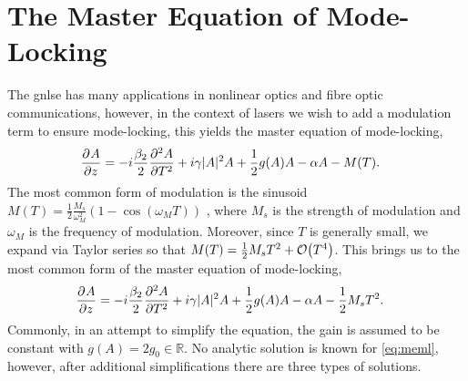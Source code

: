 \section{The Master Equation of Mode-Locking}
\label{chap:meml}
The \gls{gnlse} has many applications in nonlinear optics and fibre optic communications, however, in the context of lasers we wish to add a modulation term to ensure mode-locking, this yields the master equation of mode-locking, \cite{hausbook, haus1975, haus1986, haus1992, haus2000, kartner, tamura1996, usechak}
\begin{align}
\pdiff{A}{z} &= - i \frac{\beta_2}{2}\pdiff[2]{A}{T} + i \gamma |A|^2 A + \frac{1}{2}g(A) A - \alpha A - M(T).
\end{align}
The most common form of modulation is the sinusoid $M(T) = \frac{1}{2}\frac{M_s}{\omega_M^2} \left( 1 - \cos \left( \omega_M T \right) \right)$ \cite{hausbook, haus1975, haus1996, kartner}, where $M_s$ is the strength of modulation and $\omega_M$ is the frequency of modulation. Moreover, since $T$ is generally small, we expand via Taylor series so that $M(T) = \frac{1}{2}M_s T^2 + \bigO{T^4}$. This brings us to the most common form of the master equation of mode-locking,
\begin{align}
\label{eq:meml}
\pdiff{A}{z} &= - i \frac{\beta_2}{2}\pdiff[2]{A}{T} + i \gamma |A|^2 A + \frac{1}{2}g(A) A - \alpha A - \frac{1}{2}M_s T^2.
\end{align}
Commonly, in an attempt to simplify the equation, the gain is assumed to be constant with $g(A) = 2g_0 \in \mathbb{R}$. No analytic solution is known for \eqref{eq:meml}, however, after additional simplifications there are three types of solutions. \\

